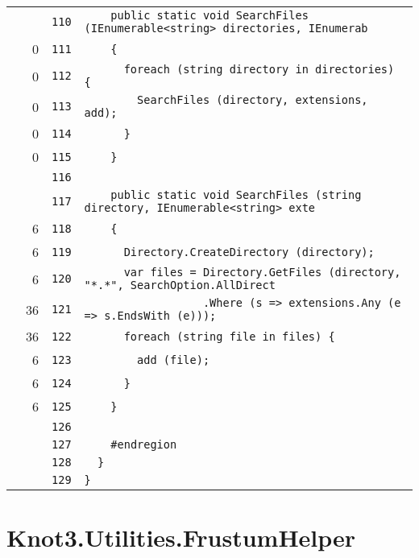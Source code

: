 \documentclass[a4paper,10pt]{article}
\begin{document}
\begin{longtable}[l]{lrrl}
\cellcolor{gray} &  & \verb~110~ & \verb~    public static void SearchFiles (IEnumerable<string> directories, IEnumerab~\\
\cellcolor{red} & 0 & \verb~111~ & \verb~    {~\\
\cellcolor{red} & 0 & \verb~112~ & \verb~      foreach (string directory in directories) {~\\
\cellcolor{red} & 0 & \verb~113~ & \verb~        SearchFiles (directory, extensions, add);~\\
\cellcolor{red} & 0 & \verb~114~ & \verb~      }~\\
\cellcolor{red} & 0 & \verb~115~ & \verb~    }~\\
\cellcolor{gray} &  & \verb~116~ & \verb~~\\
\cellcolor{gray} &  & \verb~117~ & \verb~    public static void SearchFiles (string directory, IEnumerable<string> exte~\\
\cellcolor{green} & 6 & \verb~118~ & \verb~    {~\\
\cellcolor{green} & 6 & \verb~119~ & \verb~      Directory.CreateDirectory (directory);~\\
\cellcolor{green} & 6 & \verb~120~ & \verb~      var files = Directory.GetFiles (directory, "*.*", SearchOption.AllDirect~\\
\cellcolor{green} & 36 & \verb~121~ & \verb~                  .Where (s => extensions.Any (e => s.EndsWith (e)));~\\
\cellcolor{green} & 36 & \verb~122~ & \verb~      foreach (string file in files) {~\\
\cellcolor{green} & 6 & \verb~123~ & \verb~        add (file);~\\
\cellcolor{green} & 6 & \verb~124~ & \verb~      }~\\
\cellcolor{green} & 6 & \verb~125~ & \verb~    }~\\
\cellcolor{gray} &  & \verb~126~ & \verb~~\\
\cellcolor{gray} &  & \verb~127~ & \verb~    #endregion~\\
\cellcolor{gray} &  & \verb~128~ & \verb~  }~\\
\cellcolor{gray} &  & \verb~129~ & \verb~}~\\
\end{longtable}
\newpage
\section{Knot3.Utilities.FrustumHelper}
\end{document}

